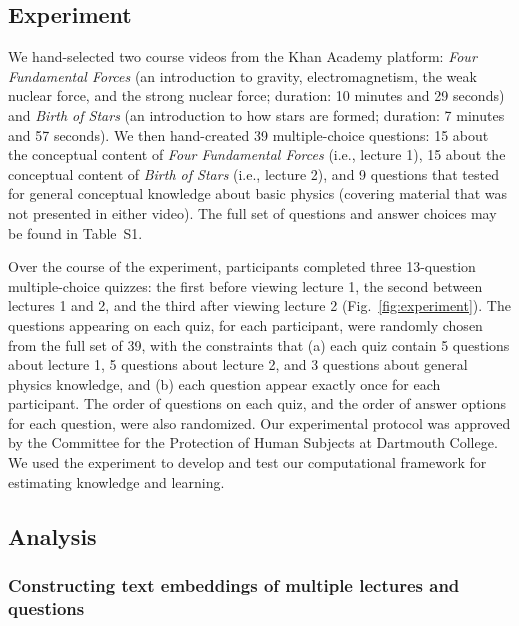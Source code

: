 \documentclass[10pt]{article}
\newcommand{\questions}{S1}
\begin{document}
\subsection*{Experiment}\label{subsec:experiment}

We hand-selected two course videos from the Khan Academy platform: \textit{Four
Fundamental Forces} (an introduction to gravity, electromagnetism, the weak
nuclear force, and the strong nuclear force; duration: 10 minutes and 29
seconds) and \textit{Birth of Stars} (an introduction to how stars are formed;
duration: 7 minutes and 57 seconds). We then hand-created 39 multiple-choice
questions: 15 about the conceptual content of \textit{Four Fundamental Forces} (i.e., lecture 1),
15 about the conceptual content of \textit{Birth of Stars} (i.e., lecture 2), and 9
questions that tested for general conceptual knowledge about basic physics
(covering material that was not presented in either video). The full set of
questions and answer choices may be found in Table~\questions.

Over the course of the experiment, participants completed three 13-question
multiple-choice quizzes: the first before viewing lecture 1, the second between
lectures 1 and 2, and the third after viewing lecture 2 (Fig.~\ref{fig:experiment}).
The questions appearing on each quiz, for each participant, were randomly
chosen from the full set of 39, with the constraints that (a) each quiz contain 5
questions about lecture 1, 5 questions about lecture 2, and 3 questions about general physics knowledge, and
(b) each question appear exactly once for each participant. The order of questions on each quiz,
and the order of answer options for each question, were also randomized. Our
experimental protocol was approved by the Committee for the Protection of
Human Subjects at Dartmouth College.  We used the experiment to develop
and test our computational framework for estimating knowledge and learning.

\subsection*{Analysis}

\subsubsection*{Constructing text embeddings of multiple lectures and questions}\label{subsec:topic-modeling}
\end{document}
